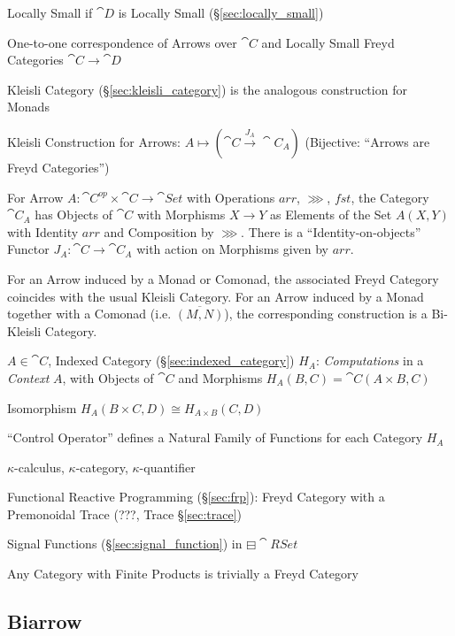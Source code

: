 Locally Small if $\cat{D}$ is Locally Small
(\S\ref{sec:locally_small})

One-to-one correspondence of Arrows over $\cat{C}$ and Locally Small
Freyd Categories $\cat{C} \rightarrow \cat{D}$

Kleisli Category (\S\ref{sec:kleisli_category}) is the analogous
construction for Monads

Kleisli Construction for Arrows: $A \mapsto (\cat{C} \xrightarrow{J_A}
\cat{C}_A)$ (Bijective: ``Arrows are Freyd Categories'')

For Arrow $A : \cat{C}^{op} \times \cat{C} \rightarrow \cat{Set}$ with
Operations $arr$, $\ggg$, $fst$, the Category $\cat{C}_A$ has Objects
of $\cat{C}$ with Morphisms $X \rightarrow Y$ as Elements of the Set
$A(X,Y)$ with Identity $arr$ and Composition by $\ggg$. There is a
``Identity-on-objects'' Functor $J_A : \cat{C} \rightarrow \cat{C}_A$
with action on Morphisms given by $arr$.

For an Arrow induced by a Monad or Comonad, the associated Freyd
Category coincides with the usual Kleisli Category. For an Arrow
induced by a Monad together with a Comonad (i.e. $\overline{(M,N)}$),
the corresponding construction is a Bi-Kleisli Category.
\cite{jacobs-heunen-hasuo09}

$A \in \cat{C}$, Indexed Category (\S\ref{sec:indexed_category})
$H_A$: \emph{Computations} in a \emph{Context} $A$, with Objects of
$\cat{C}$ and Morphisms $H_A(B,C) = \cat{C}(A \times B, C)$

Isomorphism $H_A(B \times C, D) \cong H_{A \times B} (C,D)$

``Control Operator'' defines a Natural Family of Functions for each
Category $H_A$
\cite{paterson01}

$\kappa$-calculus, $\kappa$-category, $\kappa$-quantifier %

Functional Reactive Programming (\S\ref{sec:frp}): Freyd Category with
a Premonoidal Trace (???, Trace \S\ref{sec:trace})

Signal Functions (\S\ref{sec:signal_function}) in
$\boxminus\cat{RSet}$ \cite{jeffrey12}

Any Category with Finite Products is trivially a Freyd Category
\cite{jeffrey12}



\subsection{Biarrow}\label{sec:biarrow}



